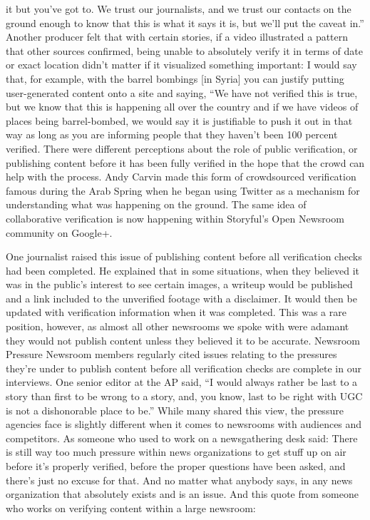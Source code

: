 \begin{enumerate}
it but you've got to. We trust our journalists, and we trust our contacts on
the ground enough to know that this is what it says it is, but we'll put the
caveat in.''
Another producer felt that with certain stories, if a video illustrated a pattern
that other sources confirmed, being unable to absolutely verify it in terms
of date or exact location didn't matter if it visualized something important:
I would say that, for example, with the barrel bombings [in Syria]
you can justify putting user-generated content onto a site and saying,
``We have not verified this is true, but we know that this is happening
all over the country and if we have videos of places being
barrel-bombed, we would say it is justifiable to push it out in that
way as long as you are informing people that they haven't been
100 percent verified.
There were different perceptions about the role of public verification, or
publishing content before it has been fully verified in the hope that the
crowd can help with the process. Andy Carvin made this form of crowdsourced
verification famous during the Arab Spring when he began using
Twitter as a mechanism for understanding what was happening on the
ground. The same idea of collaborative verification is now happening within
Storyful's Open Newsroom community on Google+.

One journalist raised this issue of publishing content before all verification
checks had been completed. He explained that in some situations, when
they believed it was in the public's interest to see certain images, a writeup
would be published and a link included to the unverified footage with a
disclaimer. It would then be updated with verification information when it
was completed. This was a rare position, however, as almost all other newsrooms
we spoke with were adamant they would not publish content unless
they believed it to be accurate.
Newsroom Pressure
Newsroom members regularly cited issues relating to the pressures they're
under to publish content before all verification checks are complete in our
interviews. One senior editor at the AP said, “I would always rather be last
to a story than first to be wrong to a story, and, you know, last to be right
with UGC is not a dishonorable place to be.''
While many shared this view, the pressure agencies face is slightly different
when it comes to newsrooms with audiences and competitors. As someone
who used to work on a newsgathering desk said:
There is still way too much pressure within news organizations to get
stuff up on air before it's properly verified, before the proper questions
have been asked, and there's just no excuse for that. And no
matter what anybody says, in any news organization that absolutely
exists and is an issue.
And this quote from someone who works on verifying content within a
large newsroom:


\end{enumerate}
